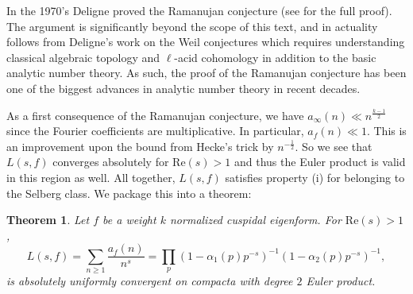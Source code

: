 \documentclass[12pt]{book}
\newtheorem{theorem}{Theorem}[section]
\theoremstyle{definition}\newframedtheorem{method}{Method}
\renewcommand{\a}{\alpha}
\newcommand{\<}{\langle}
\renewcommand{\>}{\rangle}
\renewcommand{\Re}{\mathrm{Re}}
\begin{document}
      In the 1970's Deligne proved the Ramanujan conjecture (see \cite{deligne1971formes,deligne1974conjecture} for the full proof). The argument is significantly beyond the scope of this text, and in actuality follows from Deligne's work on the Weil conjectures which requires understanding classical algebraic topology and $\ell$-acid cohomology in addition to the basic analytic number theory. As such, the proof of the Ramanujan conjecture has been one of the biggest advances in analytic number theory in recent decades.

      As a first consequence of the Ramanujan conjecture, we have $a_{\infty}(n) \ll n^{\frac{k-1}{2}}$ since the Fourier coefficients are multiplicative. In particular, $a_{f}(n) \ll 1$. This is an improvement upon the bound from Hecke's trick by $n^{-\frac{1}{2}}$. So we see that $L(s,f)$ converges absolutely for $\Re(s) > 1$ and thus the Euler product is valid in this region as well. All together, $L(s,f)$ satisfies property (i) for belonging to the Selberg class. We package this into a theorem:

      \begin{theorem}
        Let $f$ be a weight $k$ normalized cuspidal eigenform. For $\Re(s) > 1$,
        \[
          L(s,f) = \sum_{n \ge 1}\frac{a_{f}(n)}{n^{s}} = \prod_{p}(1-\a_{1}(p)p^{-s})^{-1}(1-\a_{2}(p)p^{-s})^{-1},
        \]
        is absolutely uniformly convergent on compacta with degree $2$ Euler product.
      \end{theorem}
\end{document}
